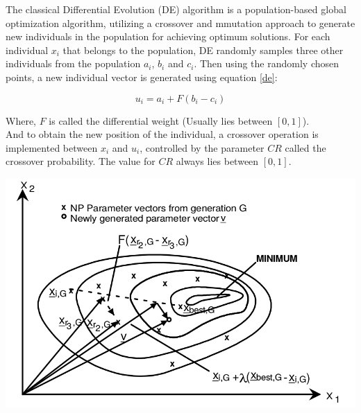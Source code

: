 \documentclass[conference]{IEEEtran}
\begin{document}
The classical Differential Evolution (DE) algorithm is a population-based global optimization algorithm, utilizing a crossover and mmutation approach to generate new individuals in the population for achieving optimum solutions. For each individual $x_i$ that belongs to the population, DE randomly samples three other individuals from the population $a_i$, $b_i$ and $c_i$. Then using the randomly chosen points, a new individual vector is generated using equation \eqref{de}:

\begin{equation}
\label{de}
u_i = a_i + F (b_i - c_i)
\end{equation}

Where, $F$ is called the differential weight (Usually lies between $[0, 1]$).\\
And to obtain the new position of the individual, a crossover operation is implemented between $x_i$ and $u_i$, controlled by the parameter $CR$ called the crossover probability. The value for $CR$ always lies between $[0, 1]$.

\includegraphics[scale=0.3]{contourDE}
\end{document}
